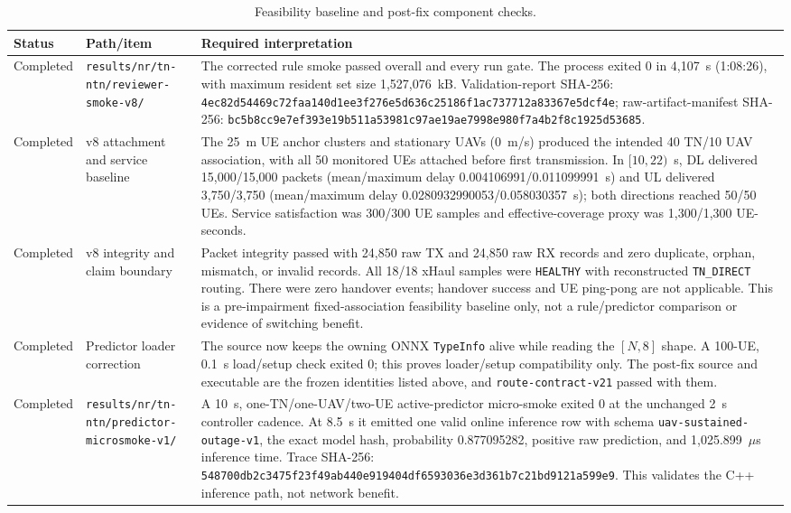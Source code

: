 \begin{table}[t]
\centering
\footnotesize
\caption{Feasibility baseline and post-fix component checks.}
\label{tab:audited_integration_feasibility}
\begin{tabular}{p{} p{} p{}}
\hline
Status & Path/item & Required interpretation \\
\hline
Completed & \texttt{results/\allowbreak nr/\allowbreak tn-\allowbreak ntn/\allowbreak reviewer-\allowbreak smoke-\allowbreak v8/\allowbreak } & The corrected rule smoke passed overall and every run gate.  The process exited 0 in 4,107~s (1:08:26), with maximum resident set size 1,527,076~kB.  Validation-report SHA-256: \texttt{4ec82d54469c72fa\allowbreak a140d1ee3f276e5d\allowbreak 636c25186f1ac737\allowbreak 712a83367e5dcf4e}; raw-artifact-manifest SHA-256: \texttt{bc5b8cc9e7ef393e\allowbreak 19b511a53981c97a\allowbreak e19ae7998e980f7a\allowbreak 4b2f8c1925d53685}. \\
Completed & v8 attachment and service baseline & The 25~m UE anchor clusters and stationary UAVs (0~m/s) produced the intended 40 TN/10 UAV association, with all 50 monitored UEs attached before first transmission.  In $[10,22)$~s, DL delivered 15,000/15,000 packets (mean/maximum delay 0.004106991/0.011099991~s) and UL delivered 3,750/3,750 (mean/maximum delay 0.0280932990053/0.058030357~s); both directions reached 50/50 UEs.  Service satisfaction was 300/300 UE samples and effective-coverage proxy was 1,300/1,300 UE-seconds. \\
Completed & v8 integrity and claim boundary & Packet integrity passed with 24,850 raw TX and 24,850 raw RX records and zero duplicate, orphan, mismatch, or invalid records.  All 18/18 xHaul samples were \texttt{HEALTHY} with reconstructed \texttt{TN\_DIRECT} routing.  There were zero handover events; handover success and UE ping-pong are not applicable.  This is a pre-impairment fixed-association feasibility baseline only, not a rule/predictor comparison or evidence of switching benefit. \\
Completed & Predictor loader correction & The source now keeps the owning ONNX \texttt{TypeInfo} alive while reading the $[N,8]$ shape.  A 100-UE, 0.1~s load/setup check exited 0; this proves loader/setup compatibility only.  The post-fix source and executable are the frozen identities listed above, and \texttt{route-\allowbreak contract-\allowbreak v21} passed with them. \\
Completed & \texttt{results/\allowbreak nr/\allowbreak tn-\allowbreak ntn/\allowbreak predictor-\allowbreak microsmoke-\allowbreak v1/\allowbreak } & A 10~s, one-TN/one-UAV/two-UE active-predictor micro-smoke exited 0 at the unchanged 2~s controller cadence.  At 8.5~s it emitted one valid online inference row with schema \texttt{uav-\allowbreak sustained-\allowbreak outage-\allowbreak v1}, the exact model hash, probability 0.877095282, positive raw prediction, and 1,025.899~$\mu$s inference time.  Trace SHA-256: \texttt{548700db2c3475f2\allowbreak 3f49ab440e919404\allowbreak df6593036e3d361b\allowbreak 7c21bd9121a599e9}.  This validates the C++ inference path, not network benefit. \\

\end{tabular}
\end{table}
